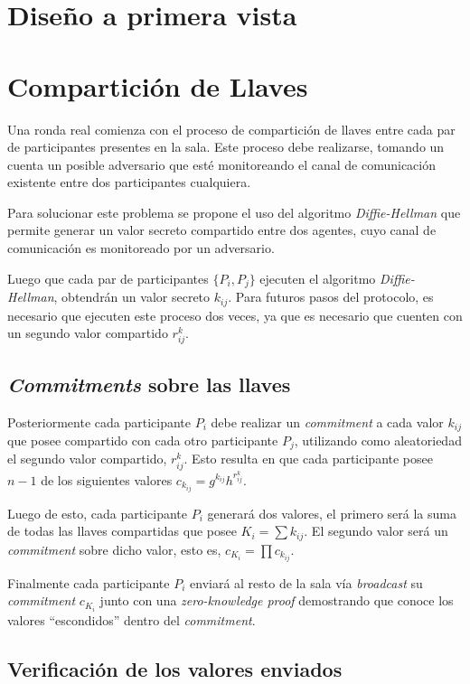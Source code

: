 \section{Diseño a primera vista}
\section{Compartición de Llaves}

Una ronda real comienza con el proceso de compartición de llaves entre cada par de participantes presentes en la sala. Este proceso debe realizarse, tomando un cuenta un posible adversario que esté monitoreando el canal de comunicación existente entre dos participantes cualquiera.

Para solucionar este problema se propone el uso del algoritmo \emph{Diffie-Hellman} \cite{diffie1976new} que permite generar un valor secreto compartido entre dos agentes, cuyo canal de comunicación es monitoreado por un adversario.

Luego que cada par de participantes $\{P_i, P_j\}$ ejecuten el algoritmo \emph{Diffie-Hellman}, obtendrán un valor secreto $k_{ij}$. Para futuros pasos del protocolo, es necesario que ejecuten este proceso dos veces, ya que es necesario que cuenten con un segundo valor compartido $r^k_{ij}$.

\subsection{\emph{Commitments} sobre las llaves}

Posteriormente cada participante $P_i$ debe realizar un \emph{commitment} a cada valor $k_{ij}$ que posee compartido con cada otro participante $P_j$, utilizando como aleatoriedad el segundo valor compartido, $r^k_{ij}$. Esto resulta en que cada participante posee $n - 1$ de los siguientes valores $c_{k_{ij}} = g^{k_{ij}} h^{r^k_{ij}}$.

Luego de esto, cada participante $P_i$ generará dos valores, el primero será la suma de todas las llaves compartidas que posee $K_i = \sum k_{ij}$. El segundo valor será un \emph{commitment} sobre dicho valor, esto es, $c_{K_i} = \prod c_{k_{ij}}$.

Finalmente cada participante $P_i$ enviará al resto de la sala vía \emph{broadcast} su \emph{commitment} $c_{K_i}$ junto con una \emph{zero-knowledge proof} demostrando que conoce los valores ``escondidos'' dentro del \emph{commitment}.

\subsection{Verificación de los valores enviados}

